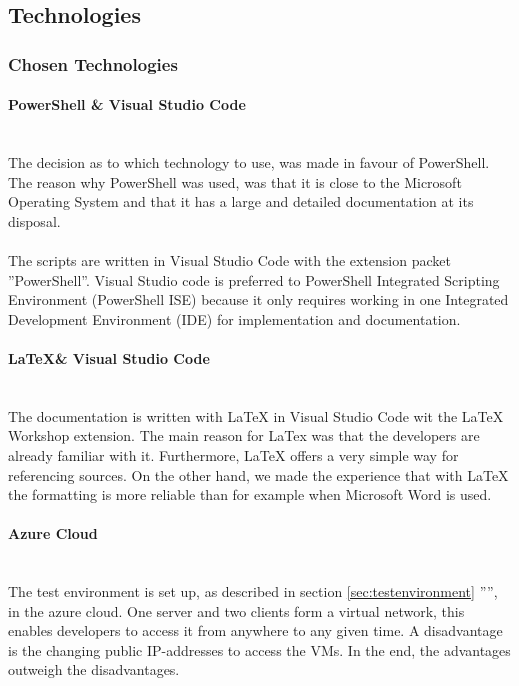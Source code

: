 \clearpage

\subsection{Technologies}
\subsubsection{Chosen Technologies}
\paragraph{PowerShell \& Visual Studio Code} \ \\
The decision as to which technology to use, was made in favour of PowerShell. The reason why PowerShell was used, was that it is close to the Microsoft Operating System and that it has a large and detailed documentation at its disposal. \ \\
\ \\
The scripts are written in Visual Studio Code with the extension packet ''PowerShell''. Visual Studio code is preferred to PowerShell Integrated Scripting Environment (PowerShell ISE) because it only requires working in one Integrated Development Environment (IDE) for implementation and documentation.

\paragraph{\LaTeX \& Visual Studio Code}\ \\
The documentation is written with LaTeX in Visual Studio Code wit the LaTeX Workshop extension. The main reason for LaTex was that the developers are already familiar with it. Furthermore, LaTeX offers a very simple way for referencing sources. On the other hand, we made the experience that with LaTeX the formatting is more reliable than for example when Microsoft Word is used.

\paragraph{Azure Cloud}\ \\
The test environment is set up, as described in section \ref{sec:testenvironment} '''', in the azure cloud. One server and two clients form a virtual network, this enables developers to access it from anywhere to any given time. A disadvantage is the changing public IP-addresses to access the VMs. In the end, the advantages outweigh the disadvantages.

